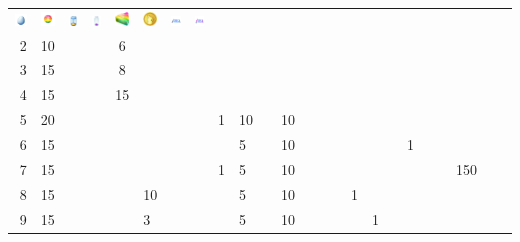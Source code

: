 \begin{table}
\begin{tabular}{r|g c g c g c g c g c g c g c g c g c g c g c g}
\includegraphics[width=1em]{images/luckyegg.png} &
\includegraphics[width=1em]{images/rarecandy.png} &
\includegraphics[width=1em]{images/incubatorlimited.png} &
\includegraphics[width=1em]{images/incubatorsuper.png} &
\includegraphics[width=1em]{images/rarecandyxl.png} &
\includegraphics[width=1em]{images/pokecoin.png} &
\includegraphics[width=1em]{images/elitefasttm.png} &
\includegraphics[width=1em]{images/elitechargedtm.png}
  \\
  2 & 10 &    &    &  6 &    &    &    &   &    &    &    &    &    &    &   &   &    &   &   &   &   &   &   \\
  3 & 15 &    &    &  8 &    &    &    &   &    &    &    &    &    &    &   &   &    &   &   &   &   &   &   \\
  4 & 15 &    &    & 15 &    &    &    &   &    &    &    &    &    &    &   &   &    &   &   &   &   &   &   \\
  5 & 20 &    &    &    &    &    &    & 1 & 10 &    & 10 &    &    &    &   &   &    &   &   &   &   &   &   \\
  6 & 15 &    &    &    &    &    &    &   &  5 &    & 10 &    &    &    &   &   &    & 1 &   &   &   &   &   \\
  7 & 15 &    &    &    &    &    &    & 1 &  5 &    & 10 &    &    &    &   &   &    &   &   &   &150&   &   \\
  8 & 15 &    &    &    & 10 &    &    &   &  5 &    & 10 &    &    &    & 1 &   &    &   &   &   &   &   &   \\
  9 & 15 &    &    &    &  3 &    &    &   &  5 &    & 10 &    &    &    &   & 1 &    &   &   &   &   &   &   \\

\end{tabular}
\end{table}
